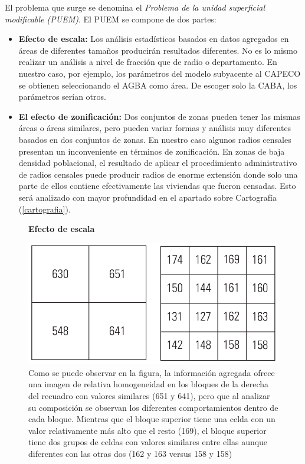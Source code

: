 El problema que surge se denomina el \textit{Problema de la unidad superficial modificable (PUEM)}. El PUEM se compone de dos partes:

\begin{itemize}
	
	\item \textbf{Efecto de escala:} Los análisis estadísticos basados en datos agregados en áreas de diferentes tamaños producirán resultados diferentes. No es lo mismo realizar un análisis a nivel de fracción que de radio o departamento. En nuestro caso, por ejemplo, los parámetros del modelo subyacente al CAPECO se obtienen seleccionando el AGBA como área. De escoger solo la CABA, los parámetros serían otros.
	
	\item  \textbf{El efecto de zonificación:} Dos conjuntos de zonas pueden tener las mismas áreas o áreas similares, pero pueden variar formas y análisis muy diferentes basados en dos conjuntos de zonas. En nuestro caso algunos radios censales presentan un inconveniente en términos de zonificación. En zonas de baja densidad poblacional, el resultado de aplicar el procedimiento administrativo de radios censales puede producir radios de enorme extensión donde solo una parte de ellos contiene efectivamente las viviendas que fueron censadas. Esto será analizado con mayor profundidad en el apartado sobre Cartografía (\ref{cartografia}).  

\end{itemize}

\begin{figure}[ht]
	\centering
	\textbf{Efecto de escala}\par\medskip
	\includegraphics[scale = 0.5]{../img/capitulo3/escala.png}
	\caption{Como se puede observar en la figura, la información agregada ofrece una imagen de relativa homogeneidad en los bloques de la derecha del recuadro con valores similares (651 y 641), pero que al analizar su composición se observan los diferentes comportamientos dentro de cada bloque. Mientras que el bloque superior tiene una celda con un valor relativamente más alto que el resto (169), el bloque superior tiene dos grupos de celdas con valores similares entre ellas aunque diferentes con las otras dos (162 y 163 versus 158 y 158)}
\end{figure}

